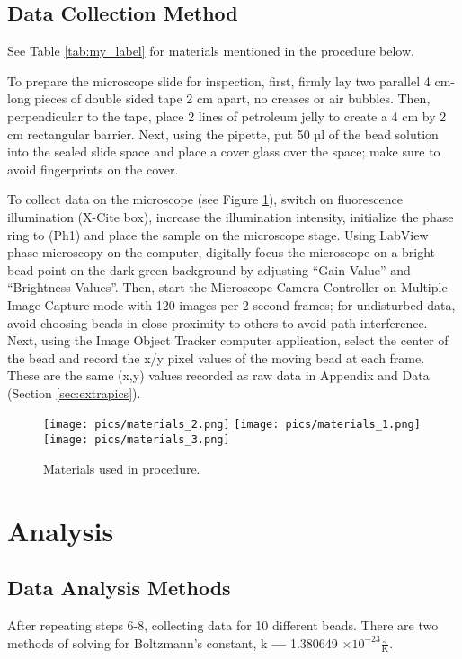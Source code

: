 \documentclass[12pt, letterpaper, twoside]{article}
\begin{document}
\subsection{Data Collection Method}

See Table \ref{tab:my_label} for materials mentioned in the procedure below.

To prepare the microscope slide for inspection, first, firmly lay two parallel 4 cm-long pieces of double sided tape 2 cm apart, no creases or air bubbles. Then, perpendicular to the tape, place 2 lines of petroleum jelly to create a 4 cm by 2 cm rectangular barrier. Next, using the pipette, put 50 µl of the bead solution into the sealed slide space and place a cover glass over the space; make sure to avoid fingerprints on the cover. 

To collect data on the microscope (see Figure \ref{fig:microscope}), switch on fluorescence illumination (X-Cite box), increase the illumination intensity, initialize the phase ring to (Ph1) and place the sample on the microscope stage. Using LabView phase microscopy on the computer, digitally focus the microscope on a bright bead point on the dark green background by adjusting “Gain Value” and “Brightness Values”. Then, start the Microscope Camera Controller on Multiple Image Capture mode with 120 images per 2 second frames; for undisturbed data, avoid choosing beads in close proximity to others to avoid path interference. Next, using the Image Object Tracker computer application, select the center of the bead and record the x/y pixel values of the moving bead at each frame. These are the same (x,y) values recorded as raw data in Appendix  and Data (Section \ref{sec:extrapics}).

\begin{figure}[!ht]
    \centering
    \texttt{[image: pics/materials\_2.png]}
    \texttt{[image: pics/materials\_1.png]}
    \texttt{[image: pics/materials\_3.png]}
    \caption{Materials used in procedure.}
    \label{fig:microscope}
\end{figure}

\section{Analysis}
\subsection{Data Analysis Methods}

After repeating steps 6-8, collecting data for 10 different beads. There are two methods of solving for Boltzmann’s constant, k \textbf{---} 1.380649 $\times10^{-23} \frac{\text{J}}{\text{K}}$.
\end{document}
